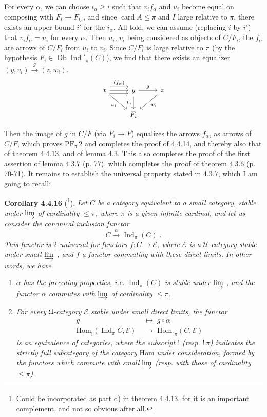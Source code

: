 \documentclass[11pt]{article}
\newcommand{\printedpage}[1]{\marginpar{\footnotesize p.~#1}}
\newcommand{\msp}[1]{\marginpar{\footnotesize [#1]}}
\newcommand{\Ind}{\operatorname{Ind}}
\newcommand{\uHom}{\underline{\mathrm{Hom}}}
\newcommand{\Ob}{\operatorname{Ob}}
\newcommand{\card}{\operatorname{card}}
\newcommand{\PF}{\mathrm{PF}}
\begin{document}
For every $\alpha$, we can choose $i_\alpha\geqslant i$ such that $v_if_\alpha$ and $u_i$ become equal on composing with $F_i\longrightarrow F_{i_\alpha}$, and since $\card A\leqslant\pi$ and $I$ large relative to $\pi$, there exists an upper bound $i'$ for the $i_\alpha$. All told, we can assume (replacing $i$ by $i'$) that $v_if_\alpha=u_i$ for every $\alpha$. Then $u_i$, $v_i$ being considered as objects of $C/F_i$, the $f_\alpha$ are arrows of $C/F_i$ from $u_i$ to $v_i$. Since $C/F_i$ is large relative to $\pi$ (by the hypothesis $F_i\in\Ob\Ind'_\pi(C)$), we find that there exists an equalizer $(y,v_i)\xrightarrow{\;g\;}(z,w_i)$.
\printedpage{26}
\[
\begin{tikzcd}
x \arrow[r, shift left=2, "(f_\alpha)"] \arrow[r] \arrow[r, shift right=2] \arrow[dr, "u_i"'] & y \arrow[r, "g"] \arrow[d, "v_i"'] & z \arrow[dl, "w_i"] \\
& F_i &
\end{tikzcd}
\]

Then the image of $g$ in $C/F$ (via $F_i\longrightarrow F$) equalizes the arrows $f_\alpha$, as arrows of $C/F$, which proves $\PF_\pi\,2$ and completes the proof of 4.4.14, and thereby also that of theorem 4.4.13, and of lemma 4.3. This also completes the proof of the first assertion of lemma
\msp{page 101}
4.3.7 (p. 77), which completes the proof of theorem 4.3.6 (p. 70-71). It remains to establish the universal property stated in 4.3.7, which I am going to recall:

\textbf{Corollary 4.4.16} (\footnote{Could be incorporated as part d) in theorem 4.4.13, for it is an important complement, and not so obvious after all.}). \textit{Let $C$ be a category equivalent to a small category, stable under $\varinjlim$ of cardinality $\leqslant\pi$, where $\pi$ is a given infinite cardinal, and let us consider the canonical inclusion functor}
\[
C\xrightarrow{\;\alpha\;}\Ind_\pi(C)\;. \tag*{(4.4.16.1)}
\]
\textit{This functor is} 2\textit{-universal for functors $f:C\longrightarrow\mathcal{E}$, where $\mathcal{E}$ is a $\mathcal{U}$-category stable under small $\varinjlim$ , and $f$ a functor commuting with these direct limits. In other words, we have}
\begin{enumerate}
\item[\textit{1$^\circ$)}] \textit{$\alpha$ has the preceding properties, i.e.} $\Ind_\pi(C)$ \textit{is stable under $\varinjlim$ , and the functor $\alpha$ commutes with $\varinjlim$ of cardinality $\leqslant\pi$.}
\item[\textit{2$^\circ$)}] \textit{For every $\mathfrak{U}$-category $\mathcal{E}$ stable under small direct limits, the functor}
\[
\begin{aligned}
g\;&\longmapsto\;g\circ\alpha\\
\uHom_{!}(\Ind_\pi C,\mathcal{E})\;&\longrightarrow\;\uHom_{!\,\pi}(C,\mathcal{E})
\end{aligned}
\tag*{(4.4.16.2)}
\]
\textit{is an equivalence of categories, where the subscript $!$ (resp. $!\,\pi$) indicates the strictly full subcategory of the category} $\uHom$
\msp{page 102}
\textit{under consideration, formed by the functors which commute with small $\varinjlim$ (resp. with those of cardinality $\leqslant\pi$).}
\end{enumerate}
\end{document}
